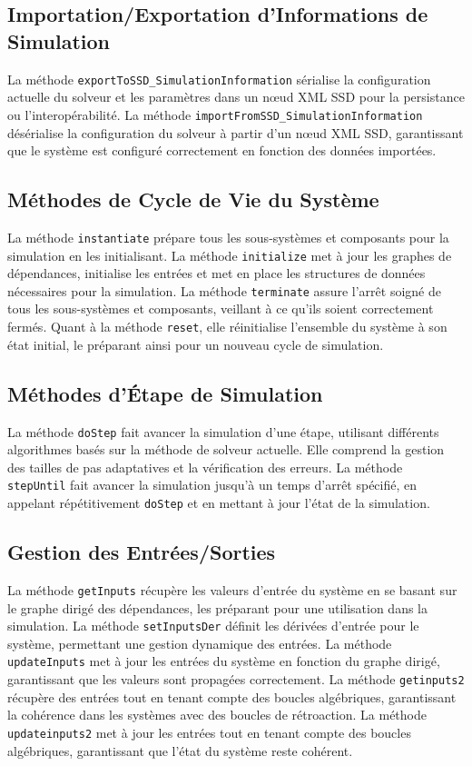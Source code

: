 \subsection*{Importation/Exportation d'Informations de Simulation}
La méthode \texttt{exportToSSD\_SimulationInformation} sérialise la configuration actuelle du solveur et les paramètres dans un nœud XML SSD pour la persistance ou l'interopérabilité. La méthode \texttt{importFromSSD\_SimulationInformation} désérialise la configuration du solveur à partir d'un nœud XML SSD, garantissant que le système est configuré correctement en fonction des données importées.

\subsection*{Méthodes de Cycle de Vie du Système}
La méthode \texttt{instantiate} prépare tous les sous-systèmes et composants pour la simulation en les initialisant. La méthode \texttt{initialize} met à jour les graphes de dépendances, initialise les entrées et met en place les structures de données nécessaires pour la simulation. La méthode \texttt{terminate} assure l'arrêt soigné de tous les sous-systèmes et composants, veillant à ce qu'ils soient correctement fermés. Quant à la méthode \texttt{reset}, elle réinitialise l'ensemble du système à son état initial, le préparant ainsi pour un nouveau cycle de simulation.

\subsection*{Méthodes d'Étape de Simulation}
La méthode \texttt{doStep} fait avancer la simulation d'une étape, utilisant différents algorithmes basés sur la méthode de solveur actuelle. Elle comprend la gestion des tailles de pas adaptatives et la vérification des erreurs. La méthode \texttt{stepUntil} fait avancer la simulation jusqu'à un temps d'arrêt spécifié, en appelant répétitivement \texttt{doStep} et en mettant à jour l'état de la simulation.


\subsection*{Gestion des Entrées/Sorties}
La méthode \texttt{getInputs} récupère les valeurs d'entrée du système en se basant sur le graphe dirigé des dépendances, les préparant pour une utilisation dans la simulation. La méthode \texttt{setInputsDer} définit les dérivées d'entrée pour le système, permettant une gestion dynamique des entrées. La méthode \texttt{updateInputs} met à jour les entrées du système en fonction du graphe dirigé, garantissant que les valeurs sont propagées correctement. La méthode \texttt{getinputs2} récupère des entrées tout en tenant compte des boucles algébriques, garantissant la cohérence dans les systèmes avec des boucles de rétroaction. La méthode \texttt{updateinputs2} met à jour les entrées tout en tenant compte des boucles algébriques, garantissant que l'état du système reste cohérent.
\newpage

